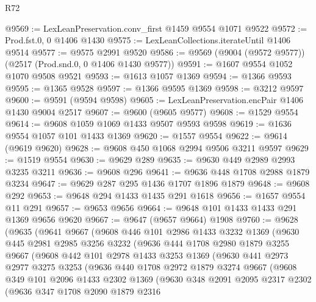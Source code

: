 \begin{lexlean}{R72}
\begin{coremodule}
@9569 := LexLeanPreservation.conv_first @1459 @9554 @1071 @9522
@9572 := Prod.fst.{0, 0} @1406 @1430
@9575 := LexLeanCollections.iterateUntil @1406 @9514
@9577 := @9575 @2991 @9520
@9586 := @9569 (@9004 (@9572 @9577)) (@2517 (Prod.snd.{0, 0} @1406 @1430 @9577))
@9591 := @1607 @9554 @1052 @1070 @9508 @9521
@9593 := @1613 @1057 @1369
@9594 := @1366 @9593
@9595 := @1365 @9528
@9597 := @1366 @9595 @1369
@9598 := @3212 @9597
@9600 := @9591 (@9594 @9598)
@9605 := LexLeanPreservation.encPair @1406 @1430 @9004 @2517
@9607 := @9600 (@9605 @9577)
@9608 := @1529 @9554
@9614 := @9608 @1059 @1069 @1433 @9507 @9593 @9598
@9619 := @1636 @9554 @1057 @101 @1433 @1369
@9620 := @1557 @9554
@9622 := @9614 (@9619 @9620)
@9628 := @9608 @450 @1068 @2994 @9506 @3211 @9597
@9629 := @1519 @9554
@9630 := @9629 @289
@9635 := @9630 @449 @2989 @2993 @3235 @3211
@9636 := @9608 @296
@9641 := @9636 @448 @1708 @2988 @1879 @3234
@9647 := @9629 @287 @295 @1436 @1707 @1896 @1879
@9648 := @9608 @292
@9653 := @9648 @294 @1433 @1435 @291 @1618
@9656 := @1657 @9554 @11 @291
@9657 := @9653 @9656
@9664 := @9648 @101 @1433 @1433 @291 @1369 @9656 @9620
@9667 := @9647 (@9657 @9664) @1908
@9760 := @9628
    (@9635
      (@9641
        @9667
        (@9608
          @446
          @101
          @2986
          @1433
          @3232
          @1369
          (@9630
            @445
            @2981
            @2985
            @3256
            @3232
            (@9636
              @444
              @1708
              @2980
              @1879
              @3255
              @9667
              (@9608
                @442
                @101
                @2978
                @1433
                @3253
                @1369
                (@9630
                  @441
                  @2973
                  @2977
                  @3275
                  @3253
                  (@9636
                    @440
                    @1708
                    @2972
                    @1879
                    @3274
                    @9667
                    (@9608
                      @349
                      @101
                      @2096
                      @1433
                      @2302
                      @1369
                      (@9630
                        @348
                        @2091
                        @2095
                        @2317
                        @2302
                        (@9636
                          @347
                          @1708
                          @2090
                          @1879
                          @2316

\end{coremodule}
\end{lexlean}
